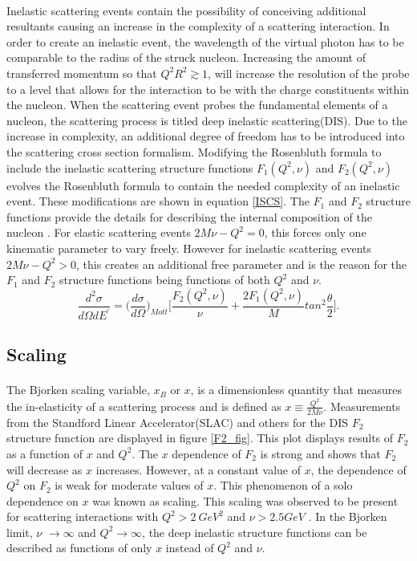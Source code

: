 \paragraph{}Inelastic scattering events contain the possibility of conceiving additional resultants causing an increase in the complexity of a scattering interaction. In order to create an inelastic event, the wavelength of the virtual photon has to be comparable to the radius of the struck nucleon. Increasing the amount of transferred momentum so that $Q^2R^2 \gtrsim 1$, will increase the resolution of the probe to a level that allows for the interaction to be with the charge constituents within the nucleon. When the scattering event probes the fundamental elements of a nucleon, the scattering process is titled deep inelastic scattering(DIS). Due to the increase in complexity, an additional degree of freedom has to be introduced into the scattering cross section formalism. Modifying the Rosenbluth formula to include the inelastic scattering structure functions $F_1(Q^2,\nu)$ and $F_2(Q^2,\nu)$ evolves the Rosenbluth formula to contain the needed complexity of an inelastic event. These modifications are shown in equation \ref{ISCS}. The $F_1$ and $F_2$ structure functions provide the details for describing the internal composition of the nucleon \cite{PnN}. For elastic scattering events $2M\nu - Q^2 = 0$, this forces only one kinematic parameter to vary freely. However for inelastic scattering events $2M\nu - Q^2 > 0$, this creates an additional free parameter and is the reason for the  $F_1$ and $F_2$ structure functions being functions of both $Q^2$ and $\nu$.
\begin{equation}
\label{ISCS}
\frac{d^2\sigma}{d\Omega dE^\prime}=\bigg(\frac{d\sigma}{d\Omega}\bigg)_{Mott} \bigg\lbrack \frac{F_2(Q^2,\nu)}{\nu} + \frac{2F_1(Q^2,\nu)}{M}tan^2\frac{\theta}{2} \bigg \rbrack.
\end{equation}  

\subsection{Scaling}
\paragraph{}The Bjorken scaling variable, $x_B$ or $x$, is a dimensionless quantity that measures the in-elasticity of a scattering process and is defined as $x \equiv \frac{Q^2}{2M\nu}$. Measurements from the Standford Linear Accelerator(SLAC) and others for the DIS $F_2$ structure function are displayed in figure \ref{F2_fig}. This plot displays results of $F_2$ as a function of $x$ and $Q^2$. The $x$ dependence of $F_2$ is strong and shows that $F_2$ will decrease as $x$ increases. However, at a constant value of $x$, the dependence of $Q^2$ on $F_2$ is weak for moderate values of $x$. This phenomenon of a solo dependence on $x$ was known as scaling. This scaling was observed to be present for scattering interactions with $Q^2 > 2 \: GeV^2$  and $\nu > 2.5 GeV$ \cite{Atwood}. In the Bjorken limit, $\nu$ $\rightarrow \infty$ and $Q^2 \rightarrow \infty$, the deep inelastic structure functions can be described as functions of only $x$ instead of $Q^2$ and $\nu$.


